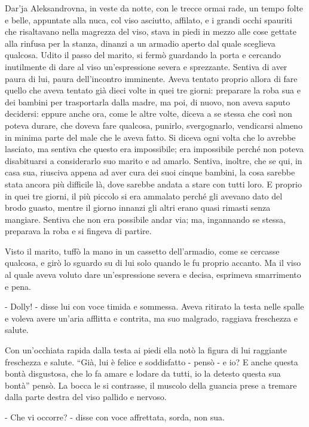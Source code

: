 Dar'ja Aleksandrovna, in veste da notte, con le trecce ormai rade, un tempo folte e belle, appuntate alla nuca, col viso asciutto, affilato, e i grandi occhi spauriti che risaltavano nella magrezza del viso, stava in piedi in mezzo alle cose gettate alla rinfusa per la stanza, dinanzi a un armadio aperto dal quale sceglieva qualcosa. Udito il passo del marito, si fermò guardando la porta e cercando inutilmente di dare al viso un'espressione severa e sprezzante. Sentiva di aver paura di lui, paura dell'incontro imminente. Aveva tentato proprio allora di fare quello che aveva tentato già dieci volte in quei tre giorni: preparare la roba sua e dei bambini per trasportarla dalla madre, ma poi, di nuovo, non aveva saputo decidersi: eppure anche ora, come le altre volte, diceva a se stessa che così non poteva durare, che doveva fare qualcosa, punirlo, svergognarlo, vendicarsi almeno in minima parte del male che le aveva fatto. Si diceva ogni volta che lo avrebbe lasciato, ma sentiva che questo era impossibile; era impossibile perché non poteva disabituarsi a considerarlo suo marito e ad amarlo. Sentiva, inoltre, che se qui, in casa sua, riusciva appena ad aver cura dei suoi cinque bambini, la cosa sarebbe stata ancora più difficile là, dove sarebbe andata a stare con tutti loro. E proprio in quei tre giorni, il più piccolo si era ammalato perché gli avevano dato del brodo guasto, mentre il giorno innanzi gli altri erano quasi rimasti senza mangiare. Sentiva che non era possibile andar via; ma, ingannando se stessa, preparava la roba e si fingeva di partire. 

Visto il marito, tuffò la mano in un cassetto dell'armadio, come se cercasse qualcosa, e girò lo sguardo su di lui solo quando le fu proprio accanto. Ma il viso al quale aveva voluto dare un'espressione severa e decisa, esprimeva smarrimento e pena. 

- Dolly! - disse lui con voce timida e sommessa. Aveva ritirato la testa nelle spalle e voleva avere un'aria afflitta e contrita, ma suo malgrado, raggiava freschezza e salute. 

Con un'occhiata rapida dalla testa ai piedi ella notò la figura di lui raggiante freschezza e salute. ``Già, lui è felice e soddisfatto - pensò - e io? E anche questa bontà disgustosa, che lo fa amare e lodare da tutti, io la detesto questa sua bontà'' pensò. La bocca le si contrasse, il muscolo della guancia prese a tremare dalla parte destra del viso pallido e nervoso. 

- Che vi occorre? - disse con voce affrettata, sorda, non sua. 

